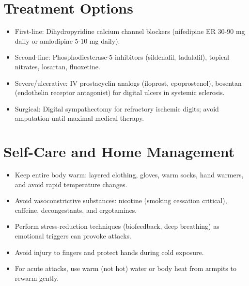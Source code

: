 \section*{Treatment Options}
\begin{itemize}
  \item First-line: Dihydropyridine calcium channel blockers (nifedipine ER 30-90 mg daily or amlodipine 5-10 mg daily).
  \item Second-line: Phosphodiesterase-5 inhibitors (sildenafil, tadalafil), topical nitrates, losartan, fluoxetine.
  \item Severe/ulcerative: IV prostacyclin analogs (iloprost, epoprostenol), bosentan (endothelin receptor antagonist) for digital ulcers in systemic sclerosis.
  \item Surgical: Digital sympathectomy for refractory ischemic digits; avoid amputation until maximal medical therapy.
\end{itemize}

\section*{Self-Care and Home Management}
\begin{itemize}
  \item Keep entire body warm: layered clothing, gloves, warm socks, hand warmers, and avoid rapid temperature changes.
  \item Avoid vasoconstrictive substances: nicotine (smoking cessation critical), caffeine, decongestants, and ergotamines.
  \item Perform stress-reduction techniques (biofeedback, deep breathing) as emotional triggers can provoke attacks.
  \item Avoid injury to fingers and protect hands during cold exposure.
  \item For acute attacks, use warm (not hot) water or body heat from armpits to rewarm gently.
\end{itemize}

